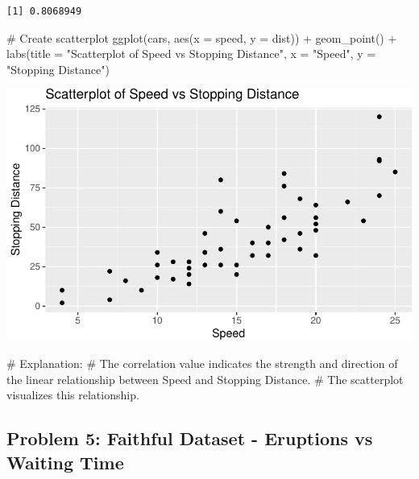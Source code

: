 \documentclass[
  letterpaper,
  DIV=11,
  numbers=noendperiod]{scrreprt}
\newenvironment{Shaded}{\begin{snugshade}}{\end{snugshade}}
\newcommand{\AttributeTok}[1]{\textcolor[rgb]{0.40,0.45,0.13}{#1}}
\newcommand{\CommentTok}[1]{\textcolor[rgb]{0.37,0.37,0.37}{#1}}
\newcommand{\FunctionTok}[1]{\textcolor[rgb]{0.28,0.35,0.67}{#1}}
\newcommand{\NormalTok}[1]{\textcolor[rgb]{0.00,0.23,0.31}{#1}}
\newcommand{\SpecialCharTok}[1]{\textcolor[rgb]{0.37,0.37,0.37}{#1}}
\newcommand{\StringTok}[1]{\textcolor[rgb]{0.13,0.47,0.30}{#1}}
\begin{document}
\begin{verbatim}
[1] 0.8068949
\end{verbatim}

\begin{Shaded}
\begin{Highlighting}[]
\CommentTok{\# Create scatterplot}
\FunctionTok{ggplot}\NormalTok{(cars, }\FunctionTok{aes}\NormalTok{(}\AttributeTok{x =}\NormalTok{ speed, }\AttributeTok{y =}\NormalTok{ dist)) }\SpecialCharTok{+}
  \FunctionTok{geom\_point}\NormalTok{() }\SpecialCharTok{+}
  \FunctionTok{labs}\NormalTok{(}\AttributeTok{title =} \StringTok{"Scatterplot of Speed vs Stopping Distance"}\NormalTok{, }\AttributeTok{x =} \StringTok{"Speed"}\NormalTok{, }\AttributeTok{y =} \StringTok{"Stopping Distance"}\NormalTok{)}
\end{Highlighting}
\end{Shaded}

\includegraphics{Scatterplots_and_Correlation_files/figure-pdf/unnamed-chunk-9-1.pdf}

\begin{Shaded}
\begin{Highlighting}[]
\CommentTok{\# Explanation:}
\CommentTok{\# The correlation value indicates the strength and direction of the linear relationship between Speed and Stopping Distance.}
\CommentTok{\# The scatterplot visualizes this relationship.}
\end{Highlighting}
\end{Shaded}

\subsection*{Problem 5: Faithful Dataset - Eruptions vs Waiting
Time}\label{problem-5-faithful-dataset---eruptions-vs-waiting-time}
\end{document}
